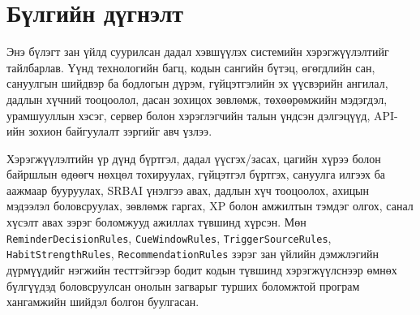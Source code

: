 \section{Бүлгийн дүгнэлт}

Энэ бүлэгт зан үйлд суурилсан дадал хэвшүүлэх системийн хэрэгжүүлэлтийг тайлбарлав. Үүнд технологийн багц, кодын сангийн бүтэц, өгөгдлийн сан, сануулгын шийдвэр ба бодлогын дүрэм, гүйцэтгэлийн эх үүсвэрийн ангилал, дадлын хүчний тооцоолол, дасан зохицох зөвлөмж, төхөөрөмжийн мэдэгдэл, урамшууллын хэсэг, сервер болон хэрэглэгчийн талын үндсэн дэлгэцүүд, API-ийн зохион байгуулалт зэргийг авч үзлээ.

Хэрэгжүүлэлтийн үр дүнд бүртгэл, дадал үүсгэх/засах, цагийн хүрээ болон байршлын өдөөгч нөхцөл тохируулах, гүйцэтгэл бүртгэх, сануулга илгээх ба аажмаар бууруулах, SRBAI үнэлгээ авах, дадлын хүч тооцоолох, ахицын мэдээлэл боловсруулах, зөвлөмж гаргах, XP болон амжилтын тэмдэг олгох, санал хүсэлт авах зэрэг боломжууд ажиллах түвшинд хүрсэн. Мөн \texttt{ReminderDecisionRules}, \texttt{CueWindowRules}, \texttt{TriggerSourceRules}, \texttt{HabitStrengthRules}, \texttt{RecommendationRules} зэрэг зан үйлийн дэмжлэгийн дүрмүүдийг нэгжийн тесттэйгээр бодит кодын түвшинд хэрэгжүүлснээр өмнөх бүлгүүдэд боловсруулсан онолын загварыг турших боломжтой програм хангамжийн шийдэл болгон буулгасан.

